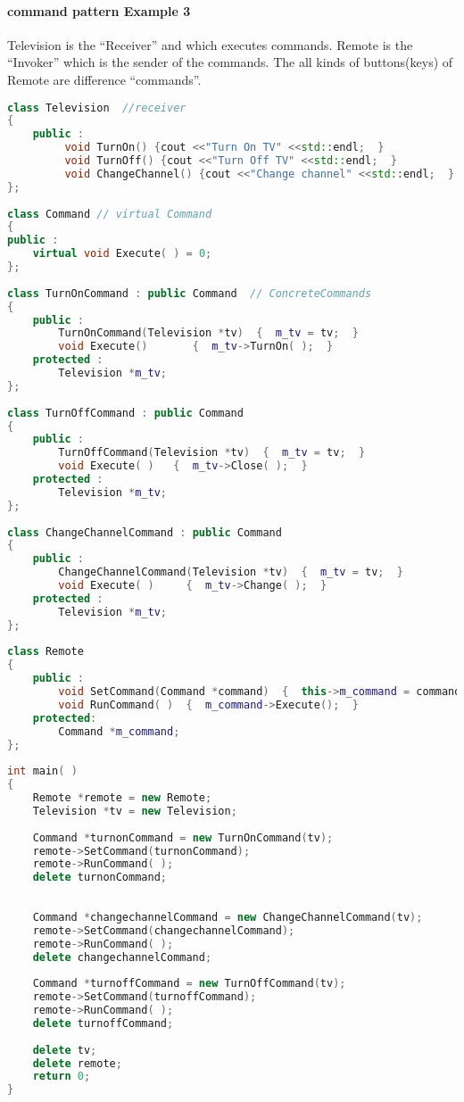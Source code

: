 \documentclass{book}
\begin{document}
\paragraph{command pattern Example 3}
Television is the ``Receiver'' and which executes commands.  
Remote is the ``Invoker'' which is the sender of the commands. 
The all kinds of buttons(keys) of Remote are difference ``commands''.
\begin{lstlisting}[caption={Command pattern sample code 3, commandexample.cpp},label={lst:cm3},language=C++]
class Television  //receiver
{  
    public :  
         void TurnOn() {cout <<"Turn On TV" <<std::endl;  }  
         void TurnOff() {cout <<"Turn Off TV" <<std::endl;  }  
         void ChangeChannel() {cout <<"Change channel" <<std::endl;  }  
};  
  
class Command // virtual Command 
{  
public :  
    virtual void Execute( ) = 0;   
};  
  
class TurnOnCommand : public Command  // ConcreteCommands  
{  
    public :  
        TurnOnCommand(Television *tv)  {  m_tv = tv;  }  
        void Execute()       {  m_tv->TurnOn( );  }  
    protected :  
        Television *m_tv;  
};  
  
class TurnOffCommand : public Command  
{  
    public :  
        TurnOffCommand(Television *tv)  {  m_tv = tv;  }  
        void Execute( )   {  m_tv->Close( );  }  
    protected :  
        Television *m_tv;  
};  
  
class ChangeChannelCommand : public Command  
{  
    public :  
        ChangeChannelCommand(Television *tv)  {  m_tv = tv;  }  
        void Execute( )     {  m_tv->Change( );  }  
    protected :  
        Television *m_tv;  
};  
  
class Remote  
{  
    public :  
        void SetCommand(Command *command)  {  this->m_command = command;  }  
        void RunCommand( )  {  m_command->Execute();  }  
    protected:  
        Command *m_command;  
};  
  
int main( )  
{  
    Remote *remote = new Remote;  
    Television *tv = new Television;  
  
    Command *turnonCommand = new TurnOnCommand(tv);  
    remote->SetCommand(turnonCommand);  
    remote->RunCommand( );  
    delete turnonCommand;  
  
  
    Command *changechannelCommand = new ChangeChannelCommand(tv);  
    remote->SetCommand(changechannelCommand);  
    remote->RunCommand( );  
    delete changechannelCommand;  
  
    Command *turnoffCommand = new TurnOffCommand(tv);  
    remote->SetCommand(turnoffCommand);  
    remote->RunCommand( );  
    delete turnoffCommand;  
  
    delete tv;  
    delete remote;  
    return 0;  
}  
\end{lstlisting}
\end{document}
